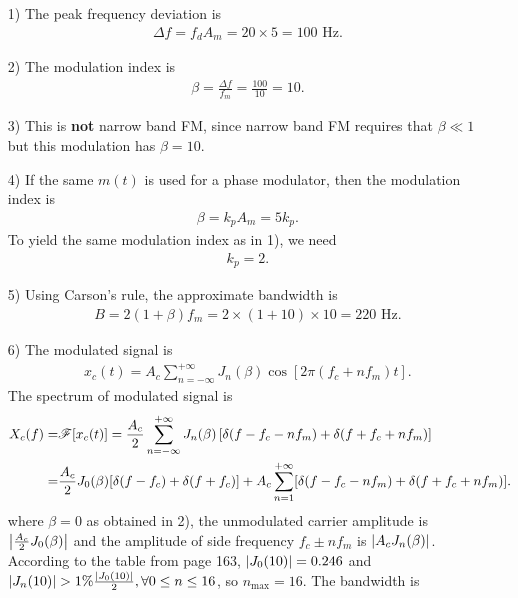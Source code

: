 \documentclass{assignment}
\begin{document}
\begin{sol}
    \begin{itemize}
        \item[1)] The peak frequency deviation is
        \begin{align}
            \Delta f=f_dA_m=20\times 5=100\text{ Hz}.
        \end{align}
        \item[2)] The modulation index is
        \begin{align}
            \beta=\frac{\Delta f}{f_m}=\frac{100}{10}=10.
        \end{align}
        \item[3)] This is \textbf{not} narrow band FM, since narrow band FM requires that $\beta\ll 1$ but this modulation has $\beta=10$.
        \item[4)] If the same $m(t)$ is used for a phase modulator, then the modulation index is
        \begin{align}
            \beta=k_pA_m=5k_p.
        \end{align}
        To yield the same modulation index as in 1), we need
        \begin{align}
            k_p=2.
        \end{align}
        \item[5)] Using Carson's rule, the approximate bandwidth is
        \begin{align}
            B=2(1+\beta)f_m=2\times(1+10)\times 10=220\text{ Hz}.
        \end{align}
        \item[6)] The modulated signal is
        \begin{align}
            x_c(t)=A_c\sum_{n=-\infty}^{+\infty}J_n(\beta)\cos[2\pi(f_c+nf_m)t].
        \end{align}
        The spectrum of modulated signal is
        \begin{align}
            \notag X_c(f)=&\mathscr{F}[x_c(t)]=\frac{A_c}{2}\sum_{n=-\infty}^{+\infty}J_n(\beta)\left[\delta(f-f_c-nf_m)+\delta(f+f_c+nf_m)\right]\\
            =&\frac{A_c}{2}J_0(\beta)[\delta(f-f_c)+\delta(f+f_c)]+A_c\sum_{n=1}^{+\infty}[\delta(f-f_c-nf_m)+\delta(f+f_c+nf_m)].
        \end{align}
        where $\beta=0$ as obtained in 2), the unmodulated carrier amplitude is $\left\lvert\frac{A_c}{2}J_0(\beta)\right\rvert$ and the amplitude of side frequency $f_c\pm nf_m$ is $\left\lvert A_cJ_n(\beta)\right\rvert$. According to the table from page 163, $\left\lvert J_0(10)\right\rvert=0.246$ and $\left\lvert J_n(10)\right\rvert>1\%\frac{\left\lvert J_0(10)\right\rvert}{2},\forall 0\leq n\leq 16$, so $n_{\max}=16$. The bandwidth is

\end{itemize}
\end{sol}
\end{document}
